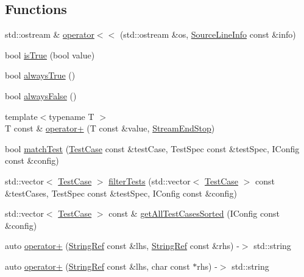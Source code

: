 \subsection*{Functions}
\begin{DoxyCompactItemize}
\item 
std\+::ostream \& \mbox{\hyperlink{namespaceCatch_a6ec18b5054d7fdfdde861c580b082995}{operator$<$$<$}} (std\+::ostream \&os, \mbox{\hyperlink{structCatch_1_1SourceLineInfo}{Source\+Line\+Info}} const \&info)
\item 
bool \mbox{\hyperlink{namespaceCatch_ae3bc6c6677e64e6eaa720dc3add31852}{is\+True}} (bool value)
\item 
bool \mbox{\hyperlink{namespaceCatch_a129be2186a2f6546206ec52c4bf2156f}{always\+True}} ()
\item 
bool \mbox{\hyperlink{namespaceCatch_ad425271249dd02956a9709e78b8b2783}{always\+False}} ()
\item 
{\footnotesize template$<$typename T $>$ }\\T const  \& \mbox{\hyperlink{namespaceCatch_a5e95b3c47a7618db3649dc39b0bb9004}{operator+}} (T const \&value, \mbox{\hyperlink{structCatch_1_1StreamEndStop}{Stream\+End\+Stop}})
\item 
bool \mbox{\hyperlink{namespaceCatch_aadef80fbc6bc84589777a462770cef49}{match\+Test}} (\mbox{\hyperlink{classCatch_1_1TestCase}{Test\+Case}} const \&test\+Case, Test\+Spec const \&test\+Spec, I\+Config const \&config)
\item 
std\+::vector$<$ \mbox{\hyperlink{classCatch_1_1TestCase}{Test\+Case}} $>$ \mbox{\hyperlink{namespaceCatch_ab5da9aa67c42a3f626aea07d0b556829}{filter\+Tests}} (std\+::vector$<$ \mbox{\hyperlink{classCatch_1_1TestCase}{Test\+Case}} $>$ const \&test\+Cases, Test\+Spec const \&test\+Spec, I\+Config const \&config)
\item 
std\+::vector$<$ \mbox{\hyperlink{classCatch_1_1TestCase}{Test\+Case}} $>$ const  \& \mbox{\hyperlink{namespaceCatch_a1c9b1a23bc947ea70ddaabf067276cf2}{get\+All\+Test\+Cases\+Sorted}} (I\+Config const \&config)
\item 
auto \mbox{\hyperlink{namespaceCatch_a3a766cb0b8c792c9151baaaf1e8003eb}{operator+}} (\mbox{\hyperlink{classCatch_1_1StringRef}{String\+Ref}} const \&lhs, \mbox{\hyperlink{classCatch_1_1StringRef}{String\+Ref}} const \&rhs) -\/$>$ std\+::string
\item 
auto \mbox{\hyperlink{namespaceCatch_ab7bdb68d0e4329df79e293f9207b55e9}{operator+}} (\mbox{\hyperlink{classCatch_1_1StringRef}{String\+Ref}} const \&lhs, char const $\ast$rhs) -\/$>$ std\+::string

\end{DoxyCompactItemize}
